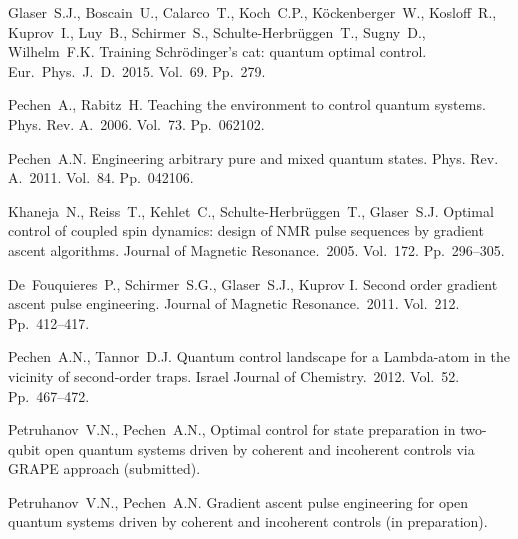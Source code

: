 \documentclass[12pt]{llncs}
\begin{document}
\begin{thebibliography}{9} %
Glaser~S.J., Boscain~U., Calarco~T., Koch~C.P., K\"{o}ckenberger~W., Kosloff~R., Kuprov~I., Luy~B., Schirmer~S., Schulte-Herbr\"{u}ggen~T., Sugny~D., Wilhelm~F.K. Training Schr\"{o}dinger's cat: quantum optimal control. Eur.~Phys.~J.~D.~2015. Vol.~69. Pp.~279.

Pechen~A., Rabitz~H. Teaching the environment to control quantum systems. Phys. Rev. A.~2006. Vol.~73. Pp.~062102.

Pechen~A.N. Engineering arbitrary pure and mixed quantum states. Phys. Rev. A.~2011. Vol.~84. Pp.~042106.

Khaneja~N., Reiss~T., Kehlet~C., Schulte-Herbr\"{u}ggen~T., Glaser~S.J. Optimal control of coupled spin dynamics: design of NMR pulse sequences by gradient ascent algorithms. Journal of Magnetic Resonance.~2005. Vol.~172. Pp.~296--305.

De~Fouquieres~P., Schirmer~S.G., Glaser~S.J., Kuprov I. Second order gradient ascent pulse engineering. Journal of Magnetic Resonance.~2011. Vol.~212. Pp.~412--417.

Pechen~A.N., Tannor~D.J. Quantum control landscape for a Lambda-atom in the vicinity of second-order traps. Israel Journal of Chemistry.~2012. Vol.~52. Pp.~467--472.

Petruhanov~V.N., Pechen~A.N., Optimal control for state preparation in two-qubit open quantum systems driven by coherent and incoherent controls via GRAPE approach (submitted).

Petruhanov~V.N., Pechen~A.N. Gradient ascent pulse engineering for open quantum systems driven by coherent and incoherent controls (in preparation).

\end{thebibliography}

\end{document}
